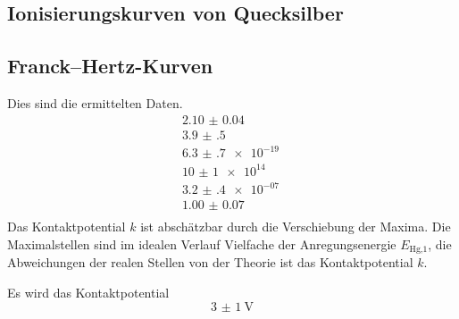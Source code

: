 \subsection{Ionisierungskurven von Quecksilber} %
\label{sec:ion}


\subsection{Franck--Hertz-Kurven} %
\label{sec:fhk}

Dies sind die ermittelten Daten.
\begin{align}
	\SI{2.10(4)}{}\\
	\SI{3.9(5)}{}\\
	\SI{6.3(7)e-19}{}\\
	\SI{10(1)e+14}{}\\
	\SI{3.2(4)e-07}{}\\
	\SI{1.00(7)}{}\\
\end{align}
Das Kontaktpotential $k$ ist abschätzbar durch die Verschiebung der Maxima.
Die Maximalstellen sind im idealen Verlauf Vielfache der Anregungsenergie $E_\text{Hg,1}$, 
die Abweichungen der realen Stellen von der Theorie ist das Kontaktpotential $k$.

Es wird das Kontaktpotential
\begin{equation}
	\SI{3(1)}{\volt}
\end{equation}
